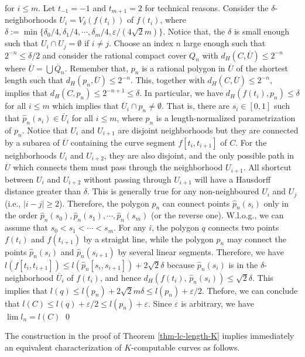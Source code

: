 \documentclass{LMCS}
\theoremstyle{plain}
\begin{document}
for $i \le m$. Let $t_{-1}=-1$ and $t_{m+1} =2$ for technical reasons. Consider the $\delta$-neighborhoods $U_i= V_\delta(f(t_i))$  of $f(t_i)$, where $\delta := \min\{\delta_0/4, \delta_1/4, \cdots, \delta_{m}/4, \varepsilon/(4\sqrt{2}m)\}$. Notice that, the $\delta$ is small enough such that $U_i \cap U_j = \emptyset$  if $i \neq j$.  Choose an index $n$ large enough such that $2^{-n} \le \delta/2$ and consider the rational compact cover $Q_n$ with $d_H(C, \overline{U})\le 2^{-n}$ where $\overline{U} =\bigcup \overline{Q}_n$. Remember that, $p_n$ is a rational polygon in $\overline{U}$ of the shortest length such that $d_H(p_n, \overline{U}) \le 2^{-n}$. This, together with $d_H(C, \overline{U})\le 2^{-n}$, implies that $d_H(C, p_n) \le 2^{-n+1} \le \delta$. In particular, we have $d_H(f(t_i), p_n)\le \delta$ for all $i\le m$ which implies that $\overline{U}_i \cap p_n \neq \emptyset$. That is, there are $s_i\in [0,1]$ such that $\hat{p}_n(s_i) \in \overline{U}_i$ for all $i\le m$, where $\hat{p}_n$ is a length-normalized parametrization of $p_n$. Notice that $U_i$ and $U_{i+1}$ are disjoint neighborhoods but they are connected by a  subarea of $\overline{U}$ containing the curve segment $f[t_i, t_{i+1}]$ of $C$. For the neighborhoods $U_i$ and $U_{i+2}$, they are also disjoint, and the only possible path in $\overline{U}$ which connects them must pass through the neighborhood $U_{i+1}$. All shortcut between $U_i$ and $U_{i+2}$ without passing through $U_{i+1}$ will have a Hausdorff distance greater than $\delta$. This is generally true for any non-neighboured  $U_i$ and $U_j$ (i.e., $|i-j| \ge 2$). Therefore, the polygon $p_n$ can connect points $\hat{p}_n(s_i)$ only in the order $\hat{p}_n(s_0), \hat{p}_n(s_1), \cdots, \hat{p}_n(s_m)$ (or the reverse one). W.l.o.g., we can assume that $s_0<s_1<\cdots <s_m$. For any $i$, the polygon $q$ connects two points $f(t_i)$ and $f(t_{i+1})$ by a straight line, while the polygon $p_n$ may connect the points $\hat{p}_n(s_i)$ and $\hat{p}_n(s_{i+1})$ by several linear segments. Therefore, we have $l(f[t_i, t_{i+1}])\le l(\hat{p}_n[s_i, s_{i+1}]) +2\sqrt{2}\delta$ because $\hat{p}_n(s_i)$ is in the $\delta$-neighborhood $\overline{U}_i$ of $f(t_i)$,  and hence $d_H(f(t_i), \, \hat{p}_n(s_i)) \le \sqrt{2}\delta$. This implies that $l(q) \le l(p_n) + 2\sqrt{2}m\delta\le l(p_n)+\varepsilon/2$. Thefore, we can conclude that $l(C) \le l(q) +\varepsilon/2 \le l(p_n) +\varepsilon$. Since $\varepsilon$ is arbitrary, we have $\lim l_n =l(C)$
\qed

The construction in the proof of Theorem \ref{thm-lc-length-K} implies immediately an equivalent characterization of $K$-computable curves as follows.
\end{document}
